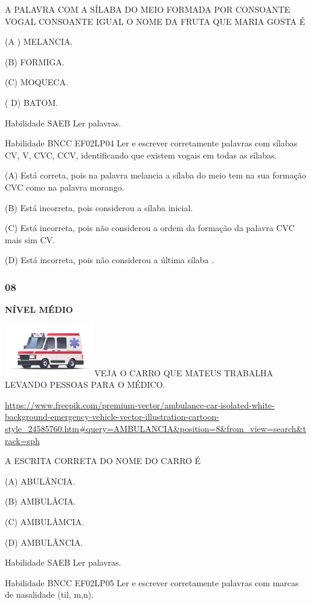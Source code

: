 \protect\hypertarget{_Hlk129368984}{}{}A PALAVRA COM A SÍLABA DO MEIO
FORMADA POR CONSOANTE VOGAL CONSOANTE IGUAL O NOME DA FRUTA QUE MARIA
GOSTA É

(A ) MELANCIA.

(B) FORMIGA.

(C) MOQUECA.

( D) BATOM.

\protect\hypertarget{_Hlk129369076}{}{} Habilidade SAEB Ler palavras.

Habilidade BNCC EF02LP04 Ler e escrever corretamente palavras com
sílabas CV, V, CVC, CCV, identificando que existem vogais em todas as
sílabas.

(A) Está correta, pois na palavra melancia a sílaba do meio tem na sua
formação CVC como na palavra morango.

(B) Está incorreta, pois considerou a sílaba inicial.

(C) Está incorreta, pois não considerou a ordem da formação da palavra
CVC mais sim CV.

(D) Está incorreta, pois não considerou a última sílaba .

\subsubsection{08}\label{section-118}

\textbf{NÍVEL MÉDIO}

\includegraphics[width=1.54514in,height=0.89444in]{media/image153.jpeg}VEJA
O CARRO QUE MATEUS TRABALHA LEVANDO PESSOAS PARA O MÉDICO.

\url{https://www.freepik.com/premium-vector/ambulance-car-isolated-white-background-emergency-vehicle-vector-illustration-cartoon-style_24585760.htm\#query=AMBULANCIA\&position=8\&from_view=search\&track=sph}

A ESCRITA CORRETA DO NOME DO CARRO É

(A) ABULÂNCIA.

(B) AMBULÂCIA.

(C) AMBULÂMCIA.

(D) AMBULÂNCIA.

\protect\hypertarget{_Hlk129375149}{}{}Habilidade SAEB Ler palavras.

Habilidade BNCC EF02LP05 Ler e escrever corretamente palavras com marcas
de nasalidade (til, m,n).

